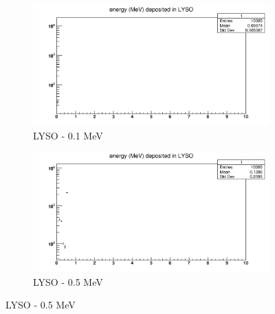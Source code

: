 \documentclass{article}
\begin{document}
\begin{figure}[H] %
\begin{subfigure}{0.5\textwidth}
\includegraphics[width=\linewidth]{images/task1/LYSO_01MeV.png}
\caption{LYSO - 0.1 MeV} 
\end{subfigure}\hspace*{\fill}
\begin{subfigure}{0.5\textwidth}
\includegraphics[width=\linewidth]{images/task1/LYSO_05MeV.png}
\caption{LYSO - 0.5 MeV} 
\end{subfigure}


\end{figure}
\end{document}
